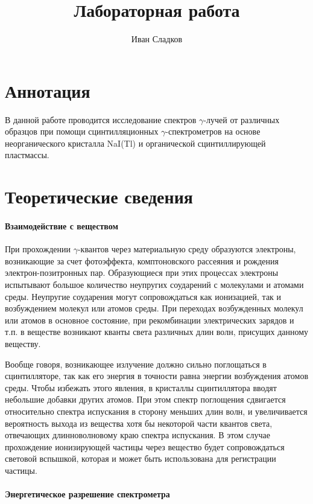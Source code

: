 \documentclass[a4paper]{article}
\title{Лабораторная работа \labnum \space \labname}
\author{Иван Сладков}
\newcommand{\gmm}{$\gamma $}
\begin{document}
\maketitle
\thispagestyle{empty}
\section{Аннотация}
В данной работе проводится исследование спектров \gmm-лучей от различных образцов при помощи сцинтилляционных \gmm-спектрометров на основе неорганического кристалла NaI(Tl) и органической сцинтиллирующей пластмассы. 

\section{Теоретические сведения}

\paragraph{Взаимодействие с веществом}

При прохождении \gmm-квантов через материальную среду образуются электроны, возникающие за счет фотоэффекта, комптоновского рассеяния и рождения электрон-позитронных пар. Образующиеся при этих процессах электроны испытывают большое количество неупругих соударений с молекулами и атомами среды. Неупругие соударения могут сопровождаться как ионизацией, так и возбуждением молекул или атомов среды. При переходах возбужденных молекул или атомов в основное состояние, при рекомбинации электрических зарядов и т.п. в веществе возникают кванты света различных длин волн, присущих данному веществу. 

Вообще говоря, возникающее излучение должно сильно поглощаться в сцинтилляторе, так как его энергия в точности равна энергии возбуждения атомов среды. Чтобы избежать этого явления, в кристаллы сцинтиллятора вводят небольшие добавки других атомов. При этом спектр поглощения сдвигается относительно спектра испускания в сторону меньших длин волн, и увеличивается вероятность выхода из вещества хотя бы некоторой части квантов света, отвечающих длинноволновому краю спектра испускания. В этом случае прохождение ионизирующей частицы через вещество будет сопровождаться световой вспышкой, которая и может быть использована для регистрации частицы. 

\paragraph{Энергетическое разрешение спектрометра}
\end{document}
